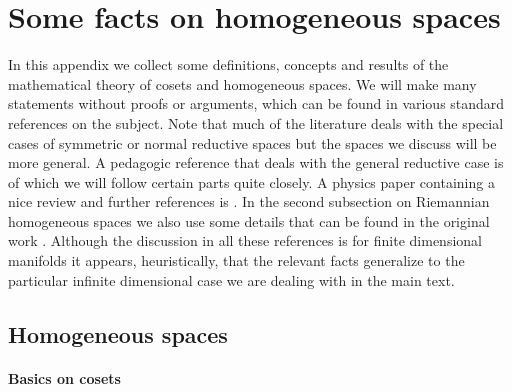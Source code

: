 \documentclass[11pt,a4paper]{article}
\begin{document}
    \section{Some facts on homogeneous spaces}\label{sec-homogeneous spaces}
    In this appendix we collect some definitions, concepts and results of the mathematical theory of cosets and homogeneous spaces. We will make many statements without proofs or arguments, which can be found in various standard references on the subject. Note that much of the literature deals with the special cases of symmetric or normal reductive spaces but the spaces we discuss will be more general. A pedagogic reference that deals with the general reductive case is \cite{arvanitogeorgos2003introduction} of which we will follow certain parts quite closely. A physics paper containing a nice review and further references is \cite{Castellani:1983tb}. In the second subsection on Riemannian homogeneous spaces we also use some details that can be found in the original work \cite{KowVa}. Although the discussion in all these references is for finite dimensional manifolds it appears, heuristically, that the relevant facts generalize to the particular infinite dimensional case we are dealing with in the main text.
    
    
    
    \subsection{Homogeneous spaces}\label{aphom}
    \paragraph{Basics on cosets}
    
\end{document}
